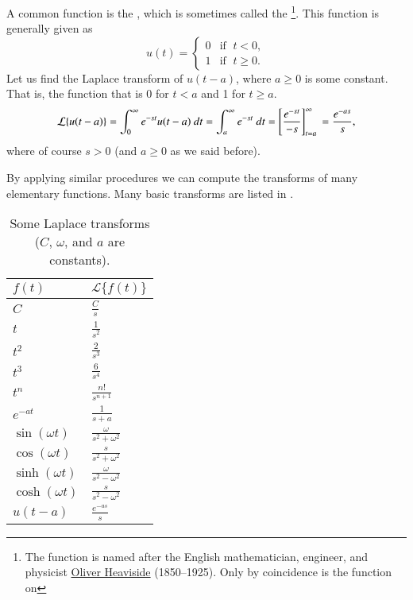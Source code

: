 \begin{example}
A common function is the \emph{}, which is
sometimes called the \emph{}%
\footnote{The function is named after the English mathematician, engineer, and
physicist
\href{https://en.wikipedia.org/wiki/Heaviside}{Oliver Heaviside}
(1850--1925).  Only
by coincidence is the function  on }.
This function is generally given as
\begin{equation*}
u(t) = 
\begin{cases}
0 & \text{if } \; t < 0 , \\
1 & \text{if } \; t \geq 0 .
\end{cases}
\end{equation*}
Let us find the Laplace transform of $u(t-a)$, where $a \geq 0$
is some constant.
That is, the function that is 0 for $t < a$ and 1 for $t \geq a$.
\begin{equation*}
\mathcal{L} \{ u(t-a) \}
=
\int_0^{\infty} e^{-st} u(t-a) ~ dt
=
\int_a^{\infty} e^{-st} ~ dt
=
\left[ \frac{e^{-st}}{-s} \right]_{t=a}^\infty \\
=
\frac{e^{-as}}{s} ,
\end{equation*}
where of course $s > 0$ (and $a \geq 0$ as we said before).
\end{example}

By applying similar procedures we can compute the transforms of many
elementary functions.  Many basic transforms are listed in
.

\begin{table}[h!t]
\capstart
\begin{center}
\begin{tabular}{@{}ll@{}}
\toprule
$f(t)$ & $\mathcal{L} \{ f(t) \}$ \\
\midrule
$C$ & $\frac{C}{s}$ \\[3pt]
$t$ & $\frac{1}{s^2}$ \\[3pt]
$t^2$ & $\frac{2}{s^3}$ \\[3pt]
$t^3$ & $\frac{6}{s^4}$ \\[3pt]
$t^n$ & $\frac{n!}{s^{n+1}}$ \\[3pt]
$e^{-at}$ & $\frac{1}{s+a}$ \\[3pt]
$\sin (\omega t)$ & $\frac{\omega}{s^2+\omega^2}$ \\[3pt]
$\cos (\omega t)$ & $\frac{s}{s^2+\omega^2}$ \\[3pt]
$\sinh (\omega t)$ & $\frac{\omega}{s^2-\omega^2}$ \\[3pt]
$\cosh (\omega t)$ & $\frac{s}{s^2-\omega^2}$ \\[3pt]
$u(t-a)$ & $\frac{e^{-as}}{s}$ \\
\bottomrule
\end{tabular}
\end{center}
\caption{Some Laplace transforms ($C$, $\omega$, and $a$ are
constants).\label{lt:table}}
\end{table}

